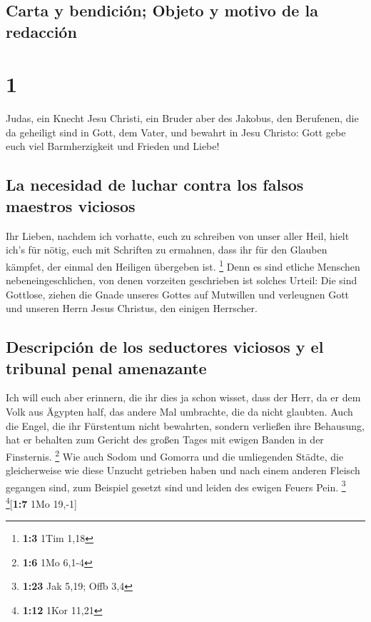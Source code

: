 \hypertarget{carta-y-bendiciuxf3n-objeto-y-motivo-de-la-redacciuxf3n}{%
\subsection{Carta y bendición; Objeto y motivo de la
redacción}\label{carta-y-bendiciuxf3n-objeto-y-motivo-de-la-redacciuxf3n}}

\hypertarget{section}{%
\section{1}\label{section}}

 Judas, ein Knecht Jesu Christi, ein Bruder aber des
Jakobus, den Berufenen, die da geheiligt sind in Gott, dem Vater, und
bewahrt in Jesu Christo:  Gott gebe euch viel
Barmherzigkeit und Frieden und Liebe!

\hypertarget{la-necesidad-de-luchar-contra-los-falsos-maestros-viciosos}{%
\subsection{La necesidad de luchar contra los falsos maestros
viciosos}\label{la-necesidad-de-luchar-contra-los-falsos-maestros-viciosos}}

 Ihr Lieben, nachdem ich vorhatte, euch zu schreiben von
unser aller Heil, hielt ich's für nötig, euch mit Schriften zu ermahnen,
dass ihr für den Glauben kämpfet, der einmal den Heiligen übergeben ist.
\footnote{\textbf{1:3} 1Tim 1,18}  Denn es sind etliche
Menschen nebeneingeschlichen, von denen vorzeiten geschrieben ist
solches Urteil: Die sind Gottlose, ziehen die Gnade unseres Gottes auf
Mutwillen und verleugnen Gott und unseren Herrn Jesus Christus, den
einigen Herrscher.

\hypertarget{descripciuxf3n-de-los-seductores-viciosos-y-el-tribunal-penal-amenazante}{%
\subsection{Descripción de los seductores viciosos y el tribunal penal
amenazante}\label{descripciuxf3n-de-los-seductores-viciosos-y-el-tribunal-penal-amenazante}}

 Ich will euch aber erinnern, die ihr dies ja schon
wisset, dass der Herr, da er dem Volk aus Ägypten half, das andere Mal
umbrachte, die da nicht glaubten.  Auch die Engel, die ihr
Fürstentum nicht bewahrten, sondern verließen ihre Behausung, hat er
behalten zum Gericht des großen Tages mit ewigen Banden in der
Finsternis. \footnote{\textbf{1:6} 1Mo 6,1-4}  Wie auch
Sodom und Gomorra und die umliegenden Städte, die gleicherweise wie
diese Unzucht getrieben haben und nach einem anderen Fleisch gegangen
sind, zum Beispiel gesetzt sind und leiden des ewigen Feuers Pein.
\footnote{\textbf{1:23} Jak 5,19; Offb 3,4} \footnote{\textbf{1:12} 1Kor
  11,21}{[}\textbf{1:7} 1Mo 19,-1{]}

